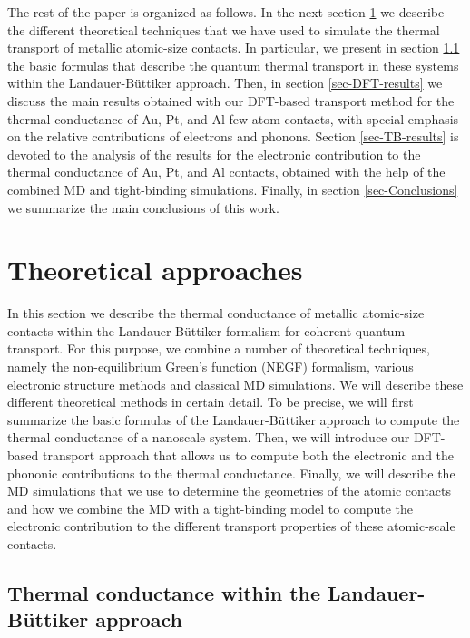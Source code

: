 \documentclass[aps,amsmath,amssymb,twocolumn,showpacs]{revtex4-1}
\begin{document}
The rest of the paper is organized as follows. In the next section
\ref{sec-Methods} we describe the different theoretical techniques that we
have used to simulate the thermal transport of metallic atomic-size contacts.
In particular, we present in section \ref{sec-LB} the basic formulas that
describe the quantum thermal transport in these systems within the
Landauer-B\"uttiker approach. Then, in section \ref{sec-DFT-results} we
discuss the main results obtained with our DFT-based transport method for the
thermal conductance of Au, Pt, and Al few-atom contacts, with special emphasis
on the relative contributions of electrons and phonons. Section
\ref{sec-TB-results} is devoted to the analysis of the results for the
electronic contribution to the thermal conductance of Au, Pt, and Al contacts,
obtained with the help of the combined MD and tight-binding
simulations. Finally, in section \ref{sec-Conclusions} we summarize the main
conclusions of this work.


\section{Theoretical approaches} \label{sec-Methods}

In this section we describe the thermal conductance of metallic atomic-size
contacts within the Landauer-B\"uttiker formalism for coherent quantum
transport. For this purpose, we combine a number of theoretical techniques,
namely the non-equilibrium Green's function (NEGF) formalism, various
electronic structure methods and classical MD simulations. We will describe
these different theoretical methods in certain detail. To be precise, we will
first summarize the basic formulas of the Landauer-B\"uttiker approach to
compute the thermal conductance of a nanoscale system. Then, we will introduce
our DFT-based transport approach that allows us to compute both the electronic
and the phononic contributions to the thermal conductance. Finally, we will
describe the MD simulations that we use to determine the geometries of the
atomic contacts and how we combine the MD with a tight-binding model to
compute the electronic contribution to the different transport properties of
these atomic-scale contacts.

\subsection{Thermal conductance within the Landauer-B\"uttiker approach} \label{sec-LB}
\end{document}
